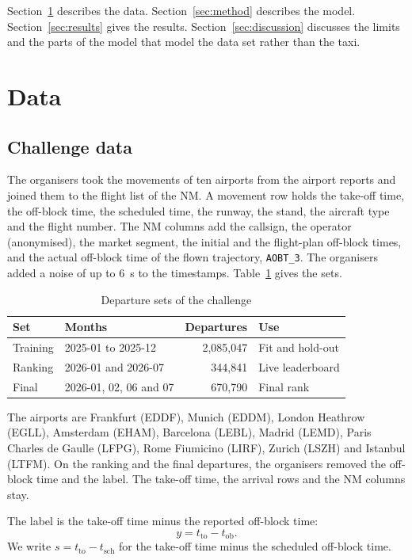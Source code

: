 \documentclass[
  manuscript=article,
  layout=preprint,
  year=2026,
  volume=x,
]{extra/joas}
\begin{document}
Section~\ref{sec:data} describes the data. Section~\ref{sec:method} describes the model. Section~\ref{sec:results} gives the results. Section~\ref{sec:discussion} discusses the limits and the parts of the model that model the data set rather than the taxi.


\section{Data}
\label{sec:data}

\subsection{Challenge data}

The organisers took the movements of ten airports from the airport reports and joined them to the flight list of the NM. A movement row holds the take-off time, the off-block time, the scheduled time, the runway, the stand, the aircraft type and the flight number. The NM columns add the callsign, the operator (anonymised), the market segment, the initial and the flight-plan off-block times, and the actual off-block time of the flown trajectory, \texttt{AOBT\_3}. The organisers added a noise of up to 6~s to the timestamps. Table~\ref{tb:sets} gives the sets.

\begin{table}[htbp!]
  \centering
  \small
  \caption{Departure sets of the challenge}
  \label{tb:sets}
  \begin{tabular}{llrl}
  \toprule
  \textbf{Set} & \textbf{Months} & \textbf{Departures} & \textbf{Use} \\
  \midrule
  Training & 2025-01 to 2025-12 & 2,085,047 & Fit and hold-out \\
  Ranking & 2026-01 and 2026-07 & 344,841 & Live leaderboard \\
  Final & 2026-01, 02, 06 and 07 & 670,790 & Final rank \\
  \bottomrule
  \end{tabular}
\end{table}

The airports are Frankfurt (EDDF), Munich (EDDM), London Heathrow (EGLL), Amsterdam (EHAM), Barcelona (LEBL), Madrid (LEMD), Paris Charles de Gaulle (LFPG), Rome Fiumicino (LIRF), Zurich (LSZH) and Istanbul (LTFM). On the ranking and the final departures, the organisers removed the off-block time and the label. The take-off time, the arrival rows and the NM columns stay.

The label is the take-off time minus the reported off-block time:
\begin{equation}
\label{eq:label}
y = t_{\mathrm{to}} - t_{\mathrm{ob}}.
\end{equation}
We write $s = t_{\mathrm{to}} - t_{\mathrm{sch}}$ for the take-off time minus the scheduled off-block time.
\end{document}
